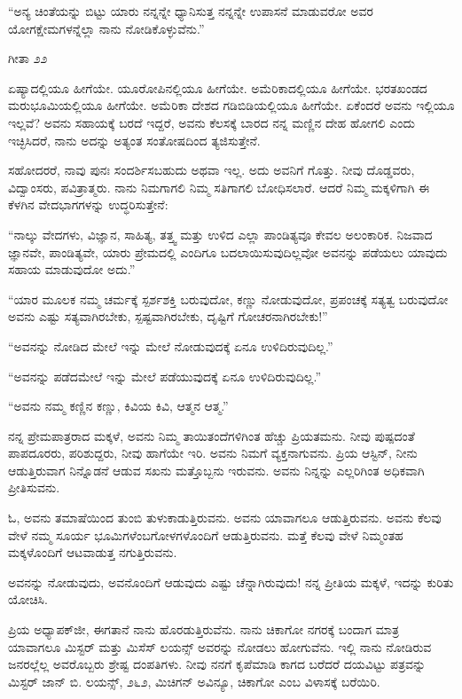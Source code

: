 “ಅನ್ಯ ಚಿಂತೆಯನ್ನು ಬಿಟ್ಟು ಯಾರು ನನ್ನನ್ನೇ ಧ್ಯಾನಿಸುತ್ತ ನನ್ನನ್ನೇ ಉಪಾಸನೆ ಮಾಡುವರೋ ಅವರ ಯೋಗಕ್ಷೇಮಗಳನ್ನೆಲ್ಲಾ ನಾನು ನೋಡಿಕೊಳ್ಳುವೆನು.”

\begin{flushright}
ಗೀತಾ  \enginline{-}೨೨
\end{flushright}

ಏಷ್ಯಾದಲ್ಲಿಯೂ ಹೀಗೆಯೇ. ಯೂರೋಪಿನಲ್ಲಿಯೂ ಹೀಗೆಯೇ. ಅಮೆರಿಕಾ\break ದಲ್ಲಿಯೂ ಹೀಗೆಯೇ. ಭರತಖಂಡದ ಮರುಭೂಮಿಯಲ್ಲಿಯೂ ಹೀಗೆಯೇ. ಅಮೆರಿಕಾ ದೇಶದ ಗಡಿಬಿಡಿಯಲ್ಲಿಯೂ ಹೀಗೆಯೇ. ಏಕೆಂದರೆ ಅವನು ಇಲ್ಲಿಯೂ ಇಲ್ಲವೆ? ಅವನು ಸಹಾಯಕ್ಕೆ ಬರದೆ ಇದ್ದರೆ, ಅವನು ಕೆಲಸಕ್ಕೆ ಬಾರದ ನನ್ನ ಮಣ್ಣಿನ ದೇಹ ಹೋಗಲಿ ಎಂದು ಇಚ್ಛಿಸಿದರೆ, ನಾನು ಅದನ್ನು ಅತ್ಯಂತ ಸಂತೋಷದಿಂದ ತ್ಯಜಿಸುತ್ತೇನೆ.

ಸಹೋದರರೆ, ನಾವು ಪುನಃ ಸಂದರ್ಶಿಸಬಹುದು ಅಥವಾ ಇಲ್ಲ. ಅದು ಅವನಿಗೆ ಗೊತ್ತು. ನೀವು ದೊಡ್ಡವರು, ವಿದ್ವಾಂಸರು, ಪವಿತ್ರಾತ್ಮರು. ನಾನು ನಿಮಗಾಗಲಿ ನಿಮ್ಮ ಸತಿಗಾಗಲಿ ಬೋಧಿಸಲಾರೆ. ಆದರೆ ನಿಮ್ಮ ಮಕ್ಕಳಿಗಾಗಿ ಈ ಕೆಳಗಿನ ವೇದಭಾಗಗಳನ್ನು ಉದ್ಧರಿಸುತ್ತೇನೆ:

“ನಾಲ್ಕು ವೇದಗಳು, ವಿಜ್ಞಾನ, ಸಾಹಿತ್ಯ, ತತ್ತ್ವ ಮತ್ತು ಉಳಿದ ಎಲ್ಲಾ ಪಾಂಡಿತ್ಯವೂ ಕೇವಲ ಅಲಂಕಾರಿಕ. ನಿಜವಾದ ಜ್ಞಾನವೇ, ಪಾಂಡಿತ್ಯವೇ, ಯಾರು ಪ್ರೇಮದಲ್ಲಿ ಎಂದಿಗೂ ಬದಲಾಯಿಸುವುದಿಲ್ಲವೋ ಅವನನ್ನು ಪಡೆಯಲು ಯಾವುದು ಸಹಾಯ ಮಾಡುವುದೋ ಅದು.”

“ಯಾರ ಮೂಲಕ ನಮ್ಮ ಚರ್ಮಕ್ಕೆ ಸ್ಪರ್ಶಶಕ್ತಿ ಬರುವುದೋ, ಕಣ್ಣು ನೋಡುವುದೋ, ಪ್ರಪಂಚಕ್ಕೆ ಸತ್ಯತ್ವ ಬರುವುದೋ ಅವನು ಎಷ್ಟು ಸತ್ಯವಾಗಿರಬೇಕು, ಸ್ಪಷ್ಟವಾಗಿರಬೇಕು, ದೃಷ್ಟಿಗೆ ಗೋಚರನಾಗಿರಬೇಕು!''

“ಅವನನ್ನು ನೋಡಿದ ಮೇಲೆ ಇನ್ನು ಮೇಲೆ ನೋಡುವುದಕ್ಕೆ ಏನೂ ಉಳಿದಿರುವುದಿಲ್ಲ.”

“ಅವನನ್ನು ಪಡೆದಮೇಲೆ ಇನ್ನು ಮೇಲೆ ಪಡೆಯುವುದಕ್ಕೆ ಏನೂ ಉಳಿದಿರುವುದಿಲ್ಲ.”

“ಅವನು ನಮ್ಮ ಕಣ್ಣಿನ ಕಣ್ಣು, ಕಿವಿಯ ಕಿವಿ, ಆತ್ಮನ ಆತ್ಮ.”

ನನ್ನ ಪ್ರೇಮಪಾತ್ರರಾದ ಮಕ್ಕಳೆ, ಅವನು ನಿಮ್ಮ ತಾಯಿತಂದೆಗಳಿಗಿಂತ ಹೆಚ್ಚು ಪ್ರಿಯತಮನು. ನೀವು ಪುಷ್ಪದಂತೆ ಪಾಪದೂರರು, ಪರಿಶುದ್ದರು, ನೀವು ಹಾಗೆಯೇ ಇರಿ. ಅವನು ನಿಮಗೆ ವ್ಯಕ್ತನಾಗುವನು. ಪ್ರಿಯ ಆಸ್ಟಿನ್, ನೀನು ಆಡುತ್ತಿರುವಾಗ ನಿನ್ನೊಡನೆ ಆಡುವ ಸಖನು ಮತ್ತೊಬ್ಬನು ಇರುವನು. ಅವನು ನಿನ್ನನ್ನು ಎಲ್ಲರಿಗಿಂತ ಅಧಿಕವಾಗಿ ಪ್ರೀತಿಸುವನು.

ಓ, ಅವನು ತಮಾಷೆಯಿಂದ ತುಂಬಿ ತುಳುಕಾಡುತ್ತಿರುವನು. ಅವನು ಯಾವಾಗಲೂ ಆಡುತ್ತಿರುವನು. ಅವನು ಕೆಲವು ವೇಳೆ ನಮ್ಮ ಸೂರ್ಯ ಭೂಮಿಗಳೆಂಬಗೋಳಗಳೊಂದಿಗೆ ಆಡುತ್ತಿರುವನು. ಮತ್ತೆ ಕೆಲವು ವೇಳೆ ನಿಮ್ಮಂತಹ ಮಕ್ಕಳೊಂದಿಗೆ ಆಟವಾಡುತ್ತ ನಗುತ್ತಿರುವನು.

ಅವನನ್ನು ನೋಡುವುದು, ಅವನೊಂದಿಗೆ ಆಡುವುದು ಎಷ್ಟು ಚೆನ್ನಾಗಿರುವುದು! ನನ್ನ ಪ್ರೀತಿಯ ಮಕ್ಕಳೆ, ಇದನ್ನು ಕುರಿತು ಯೋಚಿಸಿ.

ಪ್ರಿಯ ಅಧ್ಯಾಪಕ್‌ಜೀ, ಈಗತಾನೆ ನಾನು ಹೊರಡುತ್ತಿರುವೆನು. ನಾನು ಚಿಕಾಗೋ ನಗರಕ್ಕೆ ಬಂದಾಗ ಮಾತ್ರ ಯಾವಾಗಲೂ ಮಿಸ್ಟರ್ ಮತ್ತು ಮಿಸೆಸ್ ಲಯನ್ಸ್ ಅವರನ್ನು ನೋಡಲು ಹೋಗುವೆನು. ಇಲ್ಲಿ ನಾನು ನೋಡಿರುವ ಜನರಲ್ಲೆಲ್ಲ ಅವರೊಬ್ಬರು ಶ್ರೇಷ್ಟ ದಂಪತಿಗಳು. ನೀವು ನನಗೆ ಕೃಪೆಮಾಡಿ ಕಾಗದ ಬರೆದರೆ ದಯವಿಟ್ಟು ಪತ್ರವನ್ನು ಮಿಸ್ಟರ್ ಜಾನ್ ಬಿ. ಲಯನ್ಸ್, ೨೬೨, ಮಿಚಿಗನ್ ಅವಿನ್ಯೂ, ಚಿಕಾಗೋ ಎಂಬ ವಿಳಾಸಕ್ಕೆ ಬರೆಯಿರಿ.

